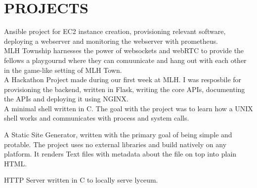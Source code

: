 \documentclass[]{resume-openfont}
\begin{document}
\begin{minipage}[t]{0.66\textwidth}

\section{PROJECTS}
Ansible project for EC2 instance creation, provisioning relevant software, deploying a webserver and monitoring the webserver with prometheus.\\

\sectionsep
{}
MLH Township harnesses the power of websockets and webRTC to provide the fellows a playgournd where they can comuunicate and hang out with each other in the game-like setting of MLH Town.\\

\sectionsep
{}
A Hackathon Project made during our first week at MLH. I was resposbile for provisioning the backend, written in Flask, writing the core APIs, documenting the APIs and deploying it using NGINX.\\

\sectionsep
{}
A minimal shell written in C. The goal with the project was to learn how a UNIX shell works and communicates with process and system calls.\\
\sectionsep

A Static Site Generator, written with the primary goal of being simple and protable. The project uses no external libraries and build natively on any platform. It renders Text files with metadata about the file on top into plain HTML.\\
\sectionsep

HTTP Server written in C to locally serve lyceum.
\sectionsep

\end{minipage}
\end{document}
